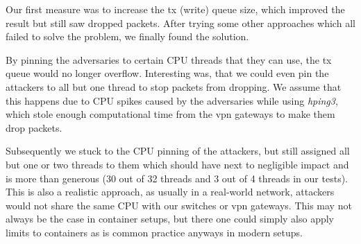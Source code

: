 Our first measure was to increase the \acrshort{tx} (write) queue size, which improved the result but still saw dropped packets. After trying some other approaches which all failed to solve the problem, we finally found the solution.

By pinning the adversaries to certain CPU threads that they can use, the \acrshort{tx} queue would no longer overflow. Interesting was, that we could even pin the attackers to all but one thread to stop packets from dropping. We assume that this happens due to CPU spikes caused by the adversaries while using \textit{hping3}, which stole enough computational time from the \acrshort{vpn} gateways to make them drop packets.

Subsequently we stuck to the CPU pinning of the attackers, but still assigned all but one or two threads to them which should have next to negligible impact and is more than generous (30 out of 32 threads and 3 out of 4 threads in our tests). This is also a realistic approach, as usually in a real-world network, attackers would not share the same CPU with our switches or \acrshort{vpn} gateways. This may not always be the case in container setups, but there one could simply also apply limits to containers as is common practice anyways in modern setups.
